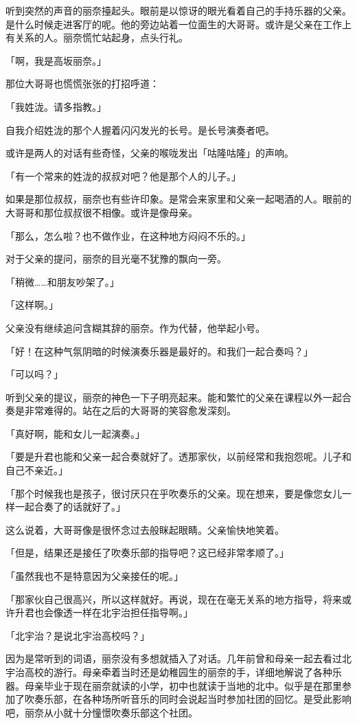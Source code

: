 \documentclass[UTF8]{ctexart}
\begin{document}
    听到突然的声音的丽奈擡起头。眼前是以惊讶的眼光看着自己的手持乐器的父亲。是什么时候走进客厅的呢。他的旁边站着一位面生的大哥哥。或许是父亲在工作上有关系的人。丽奈慌忙站起身，点头行礼。

    「啊，我是高坂丽奈。」

    那位大哥哥也慌慌张张的打招呼道：

    「我姓泷。请多指教。」

    自我介绍姓泷的那个人握着闪闪发光的长号。是长号演奏者吧。

    或许是两人的对话有些奇怪，父亲的喉咙发出「咕隆咕隆」的声响。

    「有一个常来的姓泷的叔叔对吧？他是那个人的儿子。」

    如果是那位叔叔，丽奈也有些许印象。是常会来家里和父亲一起喝酒的人。眼前的大哥哥和那位叔叔很不相像。或许是像母亲。

    「那么，怎么啦？也不做作业，在这种地方闷闷不乐的。」

    对于父亲的提问，丽奈的目光毫不犹豫的飘向一旁。

    「稍微……和朋友吵架了。」

    「这样啊。」

    父亲没有继续追问含糊其辞的丽奈。作为代替，他举起小号。

    「好！在这种气氛阴暗的时候演奏乐器是最好的。和我们一起合奏吗？」

    「可以吗？」

    听到父亲的提议，丽奈的神色一下子明亮起来。能和繁忙的父亲在课程以外一起合奏是非常难得的。站在之后的大哥哥的笑容愈发深刻。

    「真好啊，能和女儿一起演奏。」

    「要是升君也能和父亲一起合奏就好了。透那家伙，以前经常和我抱怨呢。儿子和自己不亲近。」

    「那个时候我也是孩子，很讨厌只在乎吹奏乐的父亲。现在想来，要是像您女儿一样一起合奏了的话就好了。」

    这么说着，大哥哥像是很怀念过去般眯起眼睛。父亲愉快地笑着。

    「但是，结果还是接任了吹奏乐部的指导吧？这已经非常孝顺了。」

    「虽然我也不是特意因为父亲接任的呢。」

    「那家伙自己很高兴，所以这样就好。再说，现在在毫无关系的地方指导，将来或许升君也会像透一样在北宇治担任指导啊。」

    「北宇治？是说北宇治高校吗？」

    因为是常听到的词语，丽奈没有多想就插入了对话。几年前曾和母亲一起去看过北宇治高校的游行。母亲牵着当时还是幼稚园生的丽奈的手，详细地解说了各种乐器。母亲毕业于现在丽奈就读的小学，初中也就读于当地的北中。似乎是在那里参加了吹奏乐部，在各种场所听音乐的同时会说起当时参加社团的回忆。是受此影响吧，丽奈从小就十分憧憬吹奏乐部这个社团。
\end{document}
